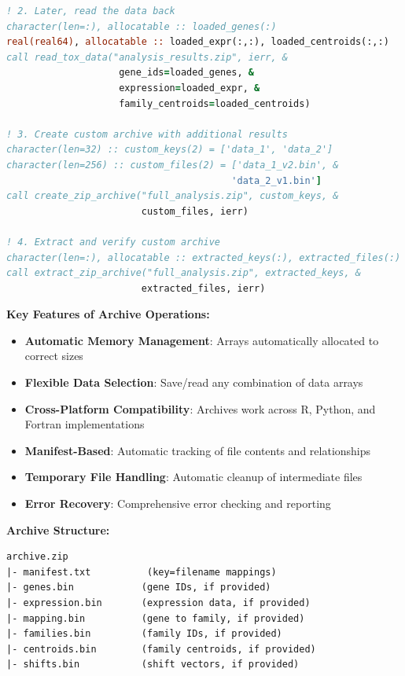 \documentclass[11pt]{article}
\begin{document}
\begin{enumerate}
\begin{itemize}
\begin{lstlisting}[language=Fortran, caption={Complete Archive Management Workflow}]
! 2. Later, read the data back
character(len=:), allocatable :: loaded_genes(:)
real(real64), allocatable :: loaded_expr(:,:), loaded_centroids(:,:)
call read_tox_data("analysis_results.zip", ierr, &
                    gene_ids=loaded_genes, &
                    expression=loaded_expr, &
                    family_centroids=loaded_centroids)

! 3. Create custom archive with additional results
character(len=32) :: custom_keys(2) = ['data_1', 'data_2']
character(len=256) :: custom_files(2) = ['data_1_v2.bin', &
                                        'data_2_v1.bin']
call create_zip_archive("full_analysis.zip", custom_keys, &
                        custom_files, ierr)

! 4. Extract and verify custom archive
character(len=:), allocatable :: extracted_keys(:), extracted_files(:)
call extract_zip_archive("full_analysis.zip", extracted_keys, &
                        extracted_files, ierr)
	      	\end{lstlisting}
	      	
	      	\textbf{Key Features of Archive Operations:}
	      	\begin{itemize}
	      		\item \textbf{Automatic Memory Management}: Arrays automatically allocated
	      		      to correct sizes
	      		      
	      		\item \textbf{Flexible Data Selection}: Save/read any combination of
	      		      data arrays
	      		      
	      		\item \textbf{Cross-Platform Compatibility}: Archives work across R,
	      		      Python, and Fortran implementations
	      		      
	      		\item \textbf{Manifest-Based}: Automatic tracking of file contents and
	      		      relationships
	      		      
	      		\item \textbf{Temporary File Handling}: Automatic cleanup of intermediate
	      		      files
	      		      
	      		\item \textbf{Error Recovery}: Comprehensive error checking and reporting
	      	\end{itemize}
	      	
	      	\textbf{Archive Structure:} 
	      	\begin{verbatim}
archive.zip
|- manifest.txt          (key=filename mappings)
|- genes.bin            (gene IDs, if provided)
|- expression.bin       (expression data, if provided)
|- mapping.bin          (gene to family, if provided)
|- families.bin         (family IDs, if provided)
|- centroids.bin        (family centroids, if provided)
|- shifts.bin           (shift vectors, if provided)
	      	\end{verbatim}
	      \end{itemize}
	      

\end{enumerate}
\end{document}

